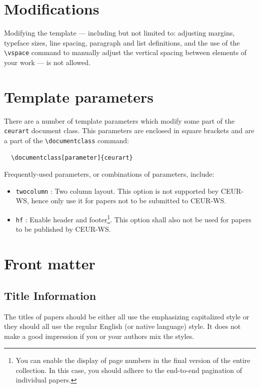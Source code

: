 \documentclass[
]{ceurart}
\begin{document}
\section{Modifications}

Modifying the template --- including but not limited to: adjusting
margins, typeface sizes, line spacing, paragraph and list definitions,
and the use of the \verb|\vspace| command to manually adjust the
vertical spacing between elements of your work --- is not allowed.

\section{Template parameters}

There are a number of template
parameters which modify some part of the \verb|ceurart| document class.
This parameters are enclosed in square
brackets and are a part of the \verb|\documentclass| command:
\begin{lstlisting}
  \documentclass[parameter]{ceurart}
\end{lstlisting}

Frequently-used parameters, or combinations of parameters, include:
\begin{itemize}
\item \verb|twocolumn| : Two column layout. This option is not supported bey CEUR-WS, hence only use it for papers not to be submitted to CEUR-WS.
\item \verb|hf| : Enable header and footer\footnote{You can enable
    the display of page numbers in the final version of the entire
    collection. In this case, you should adhere to the end-to-end
    pagination of individual papers.}.  This option shall also not be used for papers to be published by CEUR-WS.
\end{itemize}

\section{Front matter}

\subsection{Title Information}

The titles of papers should be either all use the emphasizing
capitalized style or they should all use the regular English (or
native language) style. It does not make a good impression if you or
your authors mix the styles.
\end{document}
